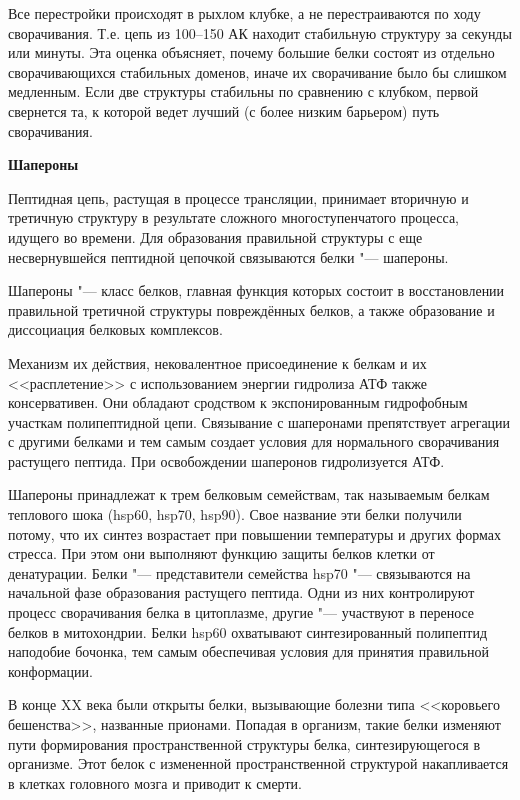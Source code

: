 \documentclass[12pt,a4paper,oneside]{book}
\begin{document}
Все перестройки происходят в рыхлом клубке, а не перестраиваются по ходу сворачивания. Т.е. цепь из 100--150 АК находит стабильную структуру за секунды или минуты. Эта оценка объясняет, почему большие белки состоят из отдельно сворачивающихся стабильных доменов, иначе их сворачивание было бы слишком медленным. Если две структуры стабильны по сравнению с клубком, первой свернется та, к которой ведет лучший (с более низким барьером) путь сворачивания.

\textbf{Шапероны}

Пептидная цепь, растущая в процессе трансляции, принимает вторичную и третичную структуру в результате сложного многоступенчатого процесса, идущего во времени. Для образования правильной структуры с еще несвернувшейся пептидной цепочкой связываются белки "--- шапероны.

Шапероны "--- класс белков, главная функция которых состоит в восстановлении правильной третичной структуры повреждённых белков, а также образование и диссоциация белковых комплексов.

Механизм их действия, нековалентное присоединение к белкам и их <<расплетение>> с использованием энергии гидролиза АТФ также консервативен. Они обладают сродством к экспонированным гидрофобным участкам полипептидной цепи. Связывание с шаперонами препятствует агрегации с другими белками и тем самым создает условия для нормального сворачивания растущего пептида. При освобождении шаперонов гидролизуется АТФ.

Шапероны принадлежат к трем белковым семействам, так называемым белкам теплового шока (hsp60, hsp70, hsp90). Свое название эти белки получили потому, что их синтез возрастает при повышении температуры и других формах стресса. При этом они выполняют функцию защиты белков клетки от денатурации. Белки "--- представители семейства hsp70 "--- связываются на начальной фазе образования растущего пептида. Одни из них контролируют процесс сворачивания белка в цитоплазме, другие "--- участвуют в переносе белков в митохондрии. Белки hsp60 охватывают синтезированный полипептид наподобие бочонка, тем самым обеспечивая условия для принятия правильной конформации.

В конце XX века были открыты белки, вызывающие болезни типа <<коровьего бешенства>>, названные прионами. Попадая в организм, такие белки изменяют пути формирования пространственной структуры белка, синтезирующегося в организме. Этот белок с измененной пространственной структурой накапливается в клетках головного мозга и приводит к смерти.
\end{document}
